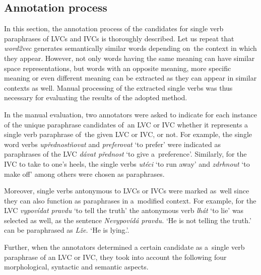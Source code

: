 \documentclass[output=paper,modfonts,nonflat]{langsci/langscibook}
\begin{document}
\subsection{Annotation process}
\label{baran:sec:annotation}
\largerpage
In this section, the annotation process of the candidates for single verb 
paraphrases of LVCs and IVCs is thoroughly described. Let us repeat that 
\emph{word2vec} generates semantically similar words depending on~the context 
in which they appear. However, not only words having the same meaning can have similar space representations, but words with an opposite meaning, more specific meaning or even different meaning can be extracted as they can appear in similar contexts as well. Manual processing of the extracted single verbs 
was thus necessary for evaluating the results of the adopted method.

In the manual evaluation, two annotators were asked to indicate for each 
instance of the unique paraphrase candidates of~an LVC or IVC whether it 
represents a single verb paraphrase of~the given LVC or IVC, or not. For 
example, the single word verbs \textit{upřednostňovat} and \textit{preferovat} 
`to prefer' were indicated as paraphrases of the LVC \textit{dávat přednost} 
`to give a~preference'. Similarly, for the IVC  
{to take to one's heels}, the single verbs 
\textit{utéci} `to run away' and \textit{zdrhnout} `to make off' among others 
were chosen as paraphrases.

Moreover, single verbs antonymous to LVCs or IVCs were marked as~well 
since they can also function as paraphrases in a~modified context. 
For example, for the LVC \textit{vypovídat pravdu} `to tell the truth' the 
antonymous verb \textit{lhát} `to lie' was selected as well, as the sentence  
\textit{Nevypovídá pravdu.} `He is not telling the truth.' can be paraphrased 
as \textit{Lže.} `He is lying.'.

Further, when the annotators determined a certain candidate as a~single 
verb paraphrase of an LVC or IVC, they took into account the following 
four morphological, syntactic and semantic aspects. 
\end{document}
